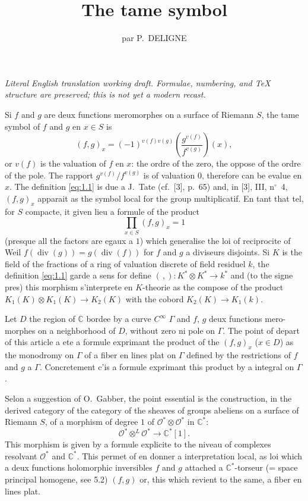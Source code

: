 \documentclass[12pt,a4paper]{article}
\title{The tame symbol}
\author{par P.~DELIGNE}
\date{}
\theoremstyle{plain}
\theoremstyle{definition}
\theoremstyle{remark}
\newcommand{\cO}{\mathcal{O}}
\newcommand{\C}{\mathbb{C}}
\providecommand{\cO}{\mathcal{O}}
\begin{document}
\begin{center}\small\emph{Literal English translation working draft. Formulae, numbering, and TeX structure are preserved; this is not yet a modern recast.}\end{center}
\vspace{0.5em}

\maketitle
\thispagestyle{empty}

Si $f$ and $g$ are deux functions meromorphes on a surface of Riemann $S$, the tame symbol of $f$ and $g$ en $x \in S$ is
\begin{equation}\label{eq:1.1}
(f,g)_x = (-1)^{v(f)v(g)}\left(\frac{g^{v(f)}}{f^{v(g)}}\right)(x),
\end{equation}
or $v(f)$ is the valuation of $f$ en $x$: the ordre of the zero, the oppose of the ordre of the pole. The rapport $g^{v(f)}/f^{v(g)}$ is of valuation $0$, therefore can be evalue en $x$. The definition \eqref{eq:1.1} is due
a J.~Tate (cf.~[3], p.~65) and, in [3], III, n${}^\circ$~4, $(f,g)_x$ apparait as the symbol local
for the group multiplicatif. En tant that tel, for $S$ compacte, it given lieu a formule
of the product
\begin{equation}\label{eq:1.2}
\prod_{x \in S} (f,g)_x = 1
\end{equation}
(presque all the factors are egaux a $1$) which generalise the loi of reciprocite of Weil
$f(\operatorname{div}(g)) = g(\operatorname{div}(f))$ for $f$ and $g$ a diviseurs disjoints. Si $K$ is the field of the fractions of a
ring of valuation discrete of field residuel $k$, the definition \eqref{eq:1.1} garde a sens for
define $(\,,) : K^* \otimes K^* \to k^*$ and (to the signe pres) this morphism s'interprete en $K$-theorie
as the compose of the product $K_1(K) \otimes K_1(K) \to K_2(K)$ with the cobord $K_2(K) \to K_1(k)$.

Let $D$ the region of $\C$ bordee by a curve $C^\infty$ $\Gamma$ and $f$, $g$ deux functions mero-
morphes on a neighborhood of $D$, without zero ni pole on $\Gamma$. The point of depart of this article
a ete a formule exprimant the product of the $(f,g)_x$ ($x \in D$) as the monodromy on $\Gamma$
of a fiber en lines plat on $\Gamma$ defined by the restrictions of $f$ and $g$ a $\Gamma$. Concretement
c'is a formule exprimant this product by a integral on $\Gamma$.

Selon a suggestion of O.~Gabber, the point essential is the construction, in the
derived category of the category of the sheaves of groups abeliens on a surface of
Riemann $S$, of a morphism of degree $1$ of $\cO^* \otimes \cO^*$ in $\C^*$:
\begin{equation}\label{eq:1.3}
\cO^* \otimes^L \cO^* \to \C^*[1].
\end{equation}
This morphism is given by a formule explicite to the niveau of complexes resolvant $\cO^*$
and $\C^*$. This permet of en donner a interpretation local, as loi which a deux functions
holomorphic inversibles $f$ and $g$ attached a $\C^*$-torseur (= space principal homogene,
see 5.2) $(f,g)$ or, this which revient to the same, a fiber en lines plat.
\end{document}
